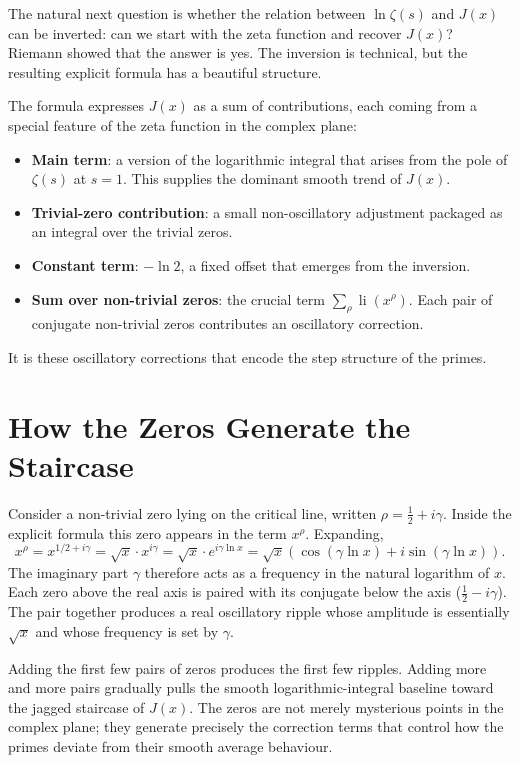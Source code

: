 \documentclass[11pt]{article}
\newcommand{\li}{\operatorname{li}}
\begin{document}
The natural next question is whether the relation between $\ln \zeta(s)$ and $J(x)$ can be inverted: can we start with the zeta function and recover $J(x)$? Riemann showed that the answer is yes. The inversion is technical, but the resulting explicit formula has a beautiful structure.

The formula expresses $J(x)$ as a sum of contributions, each coming from a special feature of the zeta function in the complex plane:

\begin{itemize}
\item \textbf{Main term}: a version of the logarithmic integral that arises from the pole of $\zeta(s)$ at $s = 1$. This supplies the dominant smooth trend of $J(x)$.
\item \textbf{Trivial-zero contribution}: a small non-oscillatory adjustment packaged as an integral over the trivial zeros.
\item \textbf{Constant term}: $-\ln 2$, a fixed offset that emerges from the inversion.
\item \textbf{Sum over non-trivial zeros}: the crucial term $\sum_{\rho} \li(x^{\rho})$. Each pair of conjugate non-trivial zeros contributes an oscillatory correction.
\end{itemize}

It is these oscillatory corrections that encode the step structure of the primes.

\section{How the Zeros Generate the Staircase}

Consider a non-trivial zero lying on the critical line, written $\rho = \tfrac{1}{2} + i\gamma$. Inside the explicit formula this zero appears in the term $x^{\rho}$. Expanding,
\[
x^{\rho} = x^{1/2 + i\gamma} = \sqrt{x} \cdot x^{i\gamma} = \sqrt{x} \cdot e^{i\gamma \ln x} = \sqrt{x}\left(\cos(\gamma \ln x) + i\sin(\gamma \ln x)\right).
\]
The imaginary part $\gamma$ therefore acts as a frequency in the natural logarithm of $x$. Each zero above the real axis is paired with its conjugate below the axis ($\tfrac{1}{2} - i\gamma$). The pair together produces a real oscillatory ripple whose amplitude is essentially $\sqrt{x}$ and whose frequency is set by $\gamma$.

Adding the first few pairs of zeros produces the first few ripples. Adding more and more pairs gradually pulls the smooth logarithmic-integral baseline toward the jagged staircase of $J(x)$. The zeros are not merely mysterious points in the complex plane; they generate precisely the correction terms that control how the primes deviate from their smooth average behaviour.
\end{document}
